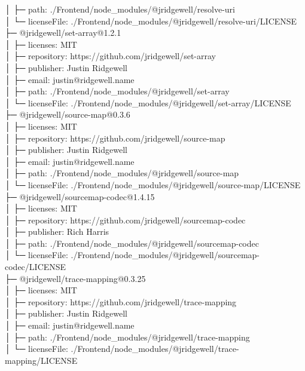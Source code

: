 \documentclass[
    paper=a4,
    twoside=false,
    parskip=half,
    listof=entryprefix,
    listof=totoc,
    index=totoc,
    bibliography=totoc,
    headsepline,
]{scrbook}
\begin{document}
    │  ├─ path: ./Frontend/node\_modules/@jridgewell/resolve-uri\\
    │  └─ licenseFile: ./Frontend/node\_modules/@jridgewell/resolve-uri/LICENSE\\
    ├─ @jridgewell/set-array@1.2.1\\
    │  ├─ licenses: MIT\\
    │  ├─ repository: https://github.com/jridgewell/set-array\\
    │  ├─ publisher: Justin Ridgewell\\
    │  ├─ email: justin@ridgewell.name\\
    │  ├─ path: ./Frontend/node\_modules/@jridgewell/set-array\\
    │  └─ licenseFile: ./Frontend/node\_modules/@jridgewell/set-array/LICENSE\\
    ├─ @jridgewell/source-map@0.3.6\\
    │  ├─ licenses: MIT\\
    │  ├─ repository: https://github.com/jridgewell/source-map\\
    │  ├─ publisher: Justin Ridgewell\\
    │  ├─ email: justin@ridgewell.name\\
    │  ├─ path: ./Frontend/node\_modules/@jridgewell/source-map\\
    │  └─ licenseFile: ./Frontend/node\_modules/@jridgewell/source-map/LICENSE\\
    ├─ @jridgewell/sourcemap-codec@1.4.15\\
    │  ├─ licenses: MIT\\
    │  ├─ repository: https://github.com/jridgewell/sourcemap-codec\\
    │  ├─ publisher: Rich Harris\\
    │  ├─ path: ./Frontend/node\_modules/@jridgewell/sourcemap-codec\\
    │  └─ licenseFile: ./Frontend/node\_modules/@jridgewell/sourcemap-codec/LICENSE\\
    ├─ @jridgewell/trace-mapping@0.3.25\\
    │  ├─ licenses: MIT\\
    │  ├─ repository: https://github.com/jridgewell/trace-mapping\\
    │  ├─ publisher: Justin Ridgewell\\
    │  ├─ email: justin@ridgewell.name\\
    │  ├─ path: ./Frontend/node\_modules/@jridgewell/trace-mapping\\
    │  └─ licenseFile: ./Frontend/node\_modules/@jridgewell/trace-mapping/LICENSE\\
\end{document}
